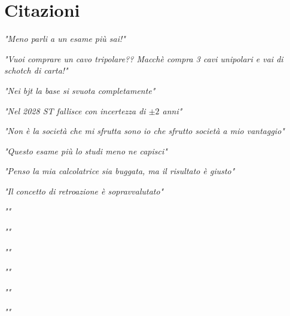 \chapter{Citazioni}

\raggedright
{\itshape "Meno parli a un esame più sai!"}
\raggedleft

\vspace{5mm}

\raggedleft
{\itshape "Vuoi comprare un cavo tripolare?? Macchè compra 3 cavi unipolari e vai di schotch di carta!"}
\raggedright

\vspace{5mm}

\raggedright
{\itshape "Nei bjt la base si svuota completamente"}
\raggedleft

\vspace{5mm}

\raggedleft
{\itshape "Nel 2028 ST fallisce con incertezza di $\pm 2$ anni"}
\raggedright

\vspace{5mm}

\raggedright
{\itshape "Non è la società che mi sfrutta sono io che sfrutto società a mio vantaggio"}
\raggedleft

\vspace{5mm}

\raggedleft
{\itshape "Questo esame più lo studi meno ne capisci"}
\raggedright

\vspace{5mm}

\raggedright
{\itshape "Penso la mia calcolatrice sia buggata, ma il risultato è giusto"}
\raggedleft

\vspace{5mm}

\raggedleft
{\itshape "Il concetto di retroazione è sopravvalutato"}
\raggedright

\vspace{5mm}

\raggedright
{\itshape ""}
\raggedleft

\vspace{5mm}

\raggedleft
{\itshape ""}
\raggedright

\vspace{5mm}

\raggedright
{\itshape ""}
\raggedleft

\vspace{5mm}

\raggedleft
{\itshape ""}
\raggedright

\vspace{5mm}

\raggedright
{\itshape ""}
\raggedleft

\vspace{5mm}

\raggedleft
{\itshape ""}
\raggedright
